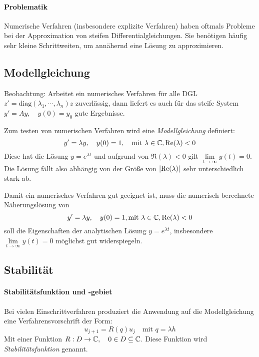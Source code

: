         \paragraph{Problematik}
	        Numerische Verfahren (insbesondere explizite Verfahren) haben oftmals Probleme bei der Approximation von steifen Differentialgleichungen. Sie benötigen häufig sehr kleine Schrittweiten, um annähernd eine Lösung zu approximieren.

        \subsection{Modellgleichung}
            Beobachtung: Arbeitet ein numerisches Verfahren für alle DGL \( z' = \textrm{diag}(\lambda_1, \cdots, \lambda_n)z \) zuverlässig, dann liefert es auch für das steife System \( y' = Ay, \quad y(0) = y_0 \) gute Ergebnisse.
            
            Zum testen von numerischen Verfahren wird eine \textit{Modellgleichung} definiert:
            \begin{equation*}
	            y' = \lambda y, \quad y(0) = 1, \quad \textrm{mit } \lambda \in \mathbb{C}, \Re(\lambda) < 0
            \end{equation*}
            Diese hat die Lösung \( y = e^{\lambda t} \) und aufgrund von \( \Re(\lambda) < 0 \) gilt \( \lim\limits_{t \rightarrow \infty} y(t) = 0 \). Die Lösung fällt also abhängig von der Größe von \(\abs{\Re(\lambda)}\) sehr unterschiedlich stark ab.
            
            Damit ein numerisches Verfahren gut geeignet ist, muss die numerisch berechnete Näherungslösung von
        	\begin{equation*}
            	y' = \lambda y, \quad y(0) = 1, \textrm{mit } \lambda \in \mathbb{C}, \Re(\lambda) < 0
        	\end{equation*}
        	soll die Eigenschaften der analytischen Lösung \( y = e^{\lambda t} \), insbesondere \( \lim\limits_{t \rightarrow \infty} y(t) = 0 \) möglichst gut widerspiegeln.

        \subsection{Stabilität}
	        \paragraph{Stabilitätsfunktion und -gebiet}
		        Bei vielen Einschrittverfahren produziert die Anwendung auf die Modellgleichung eine Verfahrensvorschrift der Form:
		        \begin{equation*}
			        u_{j+1} = R(q)u_j \quad \textrm{mit } q = \lambda h
		        \end{equation*}
		        Mit einer Funktion \( R : D \rightarrow \mathbb{C}, \quad 0 \in D \subseteq \mathbb{C} \). Diese Funktion wird \textit{Stabilitätsfunktion} genannt.
		        
